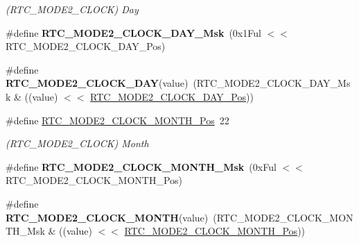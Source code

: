 \begin{DoxyCompactItemize}
\begin{DoxyCompactList}\small\item\em (R\+T\+C\+\_\+\+M\+O\+D\+E2\+\_\+\+C\+L\+O\+C\+K) Day \end{DoxyCompactList}\item 
\hypertarget{group___s_a_m_l21___r_t_c_ga373f6c6a073dd468590fd440fe2e1a85}{}\#define {\bfseries R\+T\+C\+\_\+\+M\+O\+D\+E2\+\_\+\+C\+L\+O\+C\+K\+\_\+\+D\+A\+Y\+\_\+\+Msk}~(0x1\+Ful $<$$<$ R\+T\+C\+\_\+\+M\+O\+D\+E2\+\_\+\+C\+L\+O\+C\+K\+\_\+\+D\+A\+Y\+\_\+\+Pos)\label{group___s_a_m_l21___r_t_c_ga373f6c6a073dd468590fd440fe2e1a85}

\item 
\hypertarget{group___s_a_m_l21___r_t_c_ga36656ddde1d75ef4f2a3a66342a02763}{}\#define {\bfseries R\+T\+C\+\_\+\+M\+O\+D\+E2\+\_\+\+C\+L\+O\+C\+K\+\_\+\+D\+A\+Y}(value)~(R\+T\+C\+\_\+\+M\+O\+D\+E2\+\_\+\+C\+L\+O\+C\+K\+\_\+\+D\+A\+Y\+\_\+\+Msk \& ((value) $<$$<$ \hyperlink{group___s_a_m_l21___r_t_c_gafa4112a8769af0335892fa86149f5324}{R\+T\+C\+\_\+\+M\+O\+D\+E2\+\_\+\+C\+L\+O\+C\+K\+\_\+\+D\+A\+Y\+\_\+\+Pos}))\label{group___s_a_m_l21___r_t_c_ga36656ddde1d75ef4f2a3a66342a02763}

\item 
\hypertarget{group___s_a_m_l21___r_t_c_ga2159649e9901f92c2810ef08bbed533c}{}\#define \hyperlink{group___s_a_m_l21___r_t_c_ga2159649e9901f92c2810ef08bbed533c}{R\+T\+C\+\_\+\+M\+O\+D\+E2\+\_\+\+C\+L\+O\+C\+K\+\_\+\+M\+O\+N\+T\+H\+\_\+\+Pos}~22\label{group___s_a_m_l21___r_t_c_ga2159649e9901f92c2810ef08bbed533c}

\begin{DoxyCompactList}\small\item\em (R\+T\+C\+\_\+\+M\+O\+D\+E2\+\_\+\+C\+L\+O\+C\+K) Month \end{DoxyCompactList}\item 
\hypertarget{group___s_a_m_l21___r_t_c_ga01df4726b0f275665b9cf28f2fdebc1e}{}\#define {\bfseries R\+T\+C\+\_\+\+M\+O\+D\+E2\+\_\+\+C\+L\+O\+C\+K\+\_\+\+M\+O\+N\+T\+H\+\_\+\+Msk}~(0x\+Ful $<$$<$ R\+T\+C\+\_\+\+M\+O\+D\+E2\+\_\+\+C\+L\+O\+C\+K\+\_\+\+M\+O\+N\+T\+H\+\_\+\+Pos)\label{group___s_a_m_l21___r_t_c_ga01df4726b0f275665b9cf28f2fdebc1e}

\item 
\hypertarget{group___s_a_m_l21___r_t_c_gabf14b0e19a38024bc84cd19a317506db}{}\#define {\bfseries R\+T\+C\+\_\+\+M\+O\+D\+E2\+\_\+\+C\+L\+O\+C\+K\+\_\+\+M\+O\+N\+T\+H}(value)~(R\+T\+C\+\_\+\+M\+O\+D\+E2\+\_\+\+C\+L\+O\+C\+K\+\_\+\+M\+O\+N\+T\+H\+\_\+\+Msk \& ((value) $<$$<$ \hyperlink{group___s_a_m_l21___r_t_c_ga2159649e9901f92c2810ef08bbed533c}{R\+T\+C\+\_\+\+M\+O\+D\+E2\+\_\+\+C\+L\+O\+C\+K\+\_\+\+M\+O\+N\+T\+H\+\_\+\+Pos}))\label{group___s_a_m_l21___r_t_c_gabf14b0e19a38024bc84cd19a317506db}


\end{DoxyCompactItemize}
